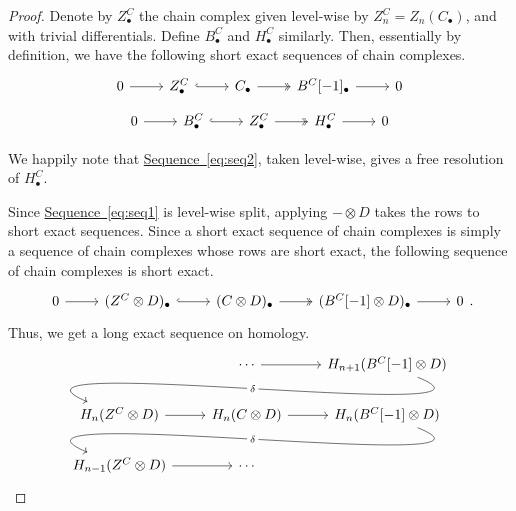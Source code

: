\documentclass[main.tex]{subfiles}
\begin{document}
\begin{proof}
  Denote by $Z^{C}_{\bullet}$ the chain complex given level-wise by $Z^{C}_{n} = Z_{n}(C_{\bullet})$, and with trivial differentials. Define $B^{C}_{\bullet}$ and $H^{C}_{\bullet}$ similarly. Then, essentially by definition, we have the following short exact sequences of chain complexes.
  \begin{equation}
    \label{eq:seq1}
    \begin{tikzcd}
      0
      \arrow[r]
      & Z^{C}_{\bullet}
      \arrow[r, hook]
      & C_{\bullet}
      \arrow[r, two heads]
      & B^{C}[-1]_{\bullet}
      \arrow[r]
      & 0
    \end{tikzcd}
  \end{equation}
  \begin{equation}
    \label{eq:seq2}
    \begin{tikzcd}
      0
      \arrow[r]
      & B^{C}_{\bullet}
      \arrow[r, hook]
      & Z^{C}_{\bullet}
      \arrow[r, two heads]
      & H^{C}_{\bullet}
      \arrow[r]
      & 0
    \end{tikzcd}
  \end{equation}

  We happily note that \hyperref[eq:seq2]{Sequence~\ref*{eq:seq2}}, taken level-wise, gives a free resolution of $H^{C}_{\bullet}$.

  Since \hyperref[eq:seq1]{Sequence~\ref*{eq:seq1}} is level-wise split, applying $- \otimes D$ takes the rows to short exact sequences. Since a short exact sequence of chain complexes is simply a sequence of chain complexes whose rows are short exact, the following sequence of chain complexes is short exact.
  \begin{equation*}
    \begin{tikzcd}
      0
      \arrow[r]
      & (Z^{C} \otimes D)_{\bullet}
      \arrow[r, hook]
      & (C \otimes D)_{\bullet}
      \arrow[r, two heads]
      & (B^{C}[-1] \otimes D)_{\bullet}
      \arrow[r]
      & 0
    \end{tikzcd}.
  \end{equation*}
  Thus, we get a long exact sequence on homology. 
  \begin{equation*}
    \begin{tikzcd}
      & \cdots
      \arrow[r]
      & H_{n+1}(B^{C}[-1] \otimes D)
      \arrow[dll, out=-22, in=157, looseness=1, overlay, "\delta" description]
      \\
      H_{n}(Z^{C} \otimes D)
      \arrow[r]
      & H_{n}(C \otimes D)
      \arrow[r]
      & H_{n}(B^{C}[-1] \otimes D)
      \arrow[dll, out=-22, in=157, looseness=1, overlay, "\delta" description]
      \\
      H_{n-1}(Z^{C} \otimes D)
      \arrow[r]
      & \cdots
    \end{tikzcd}
  \end{equation*}


\end{proof}
\end{document}
